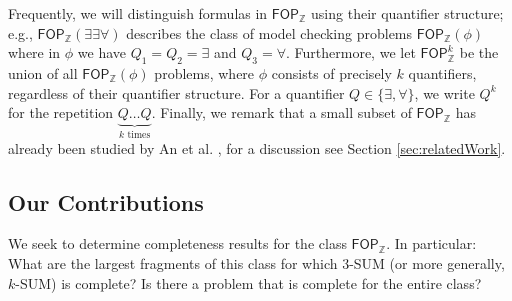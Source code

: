 Frequently, we will distinguish formulas in $\mathsf{FOP}_{\mathbb{Z}}$ using their quantifier structure; e.g., $\mathsf{FOP}_{\mathbb{Z}}(\exists \exists \forall)$ describes
the class of model checking problems $\mathsf{FOP}_{\mathbb{Z}} (\phi)$ where in $\phi$ we have $Q_1=Q_2=\exists $ and $Q_3=\forall.$ 
Furthermore, we let $\mathsf{FOP}_{\mathbb{Z}}^k$ be the union of all $\mathsf{FOP}_{\mathbb{Z}}(\phi)$ problems, where $\phi$ consists of precisely $k$ quantifiers, regardless of their quantifier structure.
For a quantifier $Q \in \{\exists,\forall\}$, we write $Q^k$ for the repetition $\underbrace{Q \dots Q}_{k \text{ times}}$.
Finally, we remark that a small subset of $\mathsf{FOP}_{\mathbb{Z}}$ has already been studied by An et al. \cite{DBLP:journals/algorithmica/AnGIJKN22}, for a discussion see Section \ref{sec:relatedWork}.

\subsection{Our Contributions}\label{sec:contributions}


We seek to determine completeness results for the class $\mathsf{FOP}_{\mathbb{Z}}$.
In particular: What are the largest fragments of this class for which 3-SUM (or more generally, $k$-SUM) is complete? Is there a problem that is complete for the entire class?

